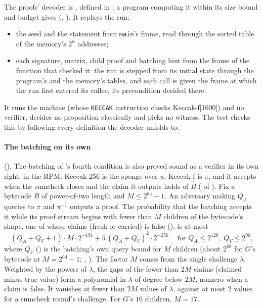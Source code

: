 \documentclass[11pt]{article}
\begin{document}
The proofs' decoder is , defined in ; a program
computing it within its size bound and budget gives 
(, ). It replays the run:
\begin{itemize}
\item the seed and the statement from \texttt{main}'s frame, read through the sorted table of the
memory's $2^\kappa$ addresses;
\item each signature, matrix, child proof and batching hint from the frame of the function that
checked it: the run is stepped from its initial state through the program's and the memory's
tables, and each call is given the frame at which the run first entered its callee, its
precondition decided there.
\end{itemize}
It runs the machine (whose \texttt{KECCAK} instruction checks Keccak-f[1600]) and no verifier,
decides no proposition classically and picks no witness. The test
 checks this by following every definition the decoder
unfolds to.

\paragraph{The batching on its own} (). The batching of 's fourth
condition is also proved sound as a verifier in its own right, in the RPM: Keccak-256 is the sponge
over $\pi$, Keccak-f is $\pi$, and it accepts when the sumcheck closes and the claim it outputs
holds of $\widehat{B}$ ( of ). Fix a bytecode $B$ of power-of-two
length and $M \le 2^{64}-1$. An adversary making $Q_A$ queries to $\pi$ and $\pi^{-1}$ outputs a
proof. The probability that the batching accepts it while its proof stream begins with fewer than
$M$ children of the bytecode's shape, one of whose claims (fresh or carried) is false
(), is at most
\[
\boxed{\ (Q_A + Q_V + 1)\cdot M\cdot 2^{-191} + 5\,(Q_A+Q_V)^2\cdot 2^{-256}\ }
\quad\text{for } Q_A \le 2^{128},\ Q_V \le 2^{96},
\]
where $Q_V$ () is the batching's own query bound for $M$ children (about
$2^{68}$ for $G$'s bytecode at $M = 2^{64}-1$; , ). The factor $M$ comes from
the single challenge $\lambda$. Weighted by the powers of $\lambda$, the gaps of the fewer than $2M$
claims (claimed minus true value) form a polynomial in $\lambda$ of degree below $2M$, nonzero when
a claim is false. It vanishes at fewer than $2M$ values of $\lambda$, against at most $2$ values for
a sumcheck round's challenge. For $G$'s $16$ children, $M = 17$.
\end{document}
